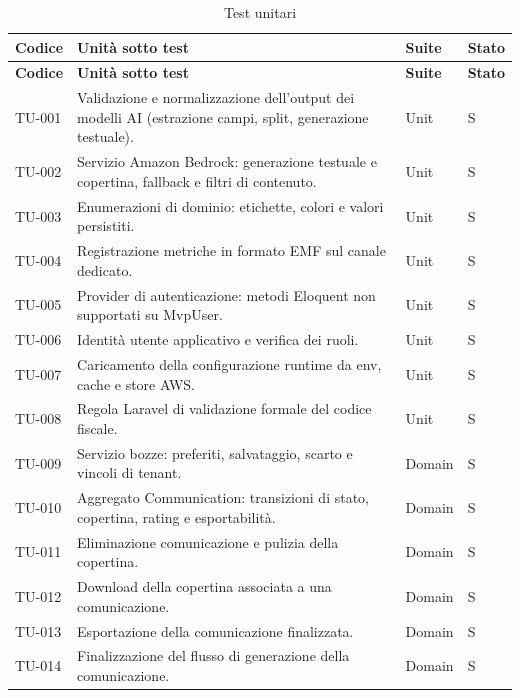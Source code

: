 \documentclass[a4paper,12pt]{article}
\begin{document}
\renewcommand{\arraystretch}{1.15}
\begin{longtable}{|p{2.0cm}|p{8.8cm}|p{2.2cm}|p{1.5cm}|}
    \caption{Test unitari} \label{tab:tu} \\
    \hline
    \rowcolor{gray!20}
    \textbf{Codice} & \textbf{Unità sotto test} & \textbf{Suite} & \textbf{Stato} \\
    \hline
\endfirsthead
    \hline
    \rowcolor{gray!20}
    \textbf{Codice} & \textbf{Unità sotto test} & \textbf{Suite} & \textbf{Stato} \\
    \hline
\endhead
    \hline
\endfoot
    \hline
\endlastfoot
    TU-001 & Validazione e normalizzazione dell'output dei modelli AI (estrazione campi, split, generazione testuale). & Unit & S \\
    \hline
    TU-002 & Servizio Amazon Bedrock: generazione testuale e copertina, fallback e filtri di contenuto. & Unit & S \\
    \hline
    TU-003 & Enumerazioni di dominio: etichette, colori e valori persistiti. & Unit & S \\
    \hline
    TU-004 & Registrazione metriche in formato EMF sul canale dedicato. & Unit & S \\
    \hline
    TU-005 & Provider di autenticazione: metodi Eloquent non supportati su MvpUser. & Unit & S \\
    \hline
    TU-006 & Identità utente applicativo e verifica dei ruoli. & Unit & S \\
    \hline
    TU-007 & Caricamento della configurazione runtime da env, cache e store AWS. & Unit & S \\
    \hline
    TU-008 & Regola Laravel di validazione formale del codice fiscale. & Unit & S \\
    \hline
    TU-009 & Servizio bozze: preferiti, salvataggio, scarto e vincoli di tenant. & Domain & S \\
    \hline
    TU-010 & Aggregato Communication: transizioni di stato, copertina, rating e esportabilità. & Domain & S \\
    \hline
    TU-011 & Eliminazione comunicazione e pulizia della copertina. & Domain & S \\
    \hline
    TU-012 & Download della copertina associata a una comunicazione. & Domain & S \\
    \hline
    TU-013 & Esportazione della comunicazione finalizzata. & Domain & S \\
    \hline
    TU-014 & Finalizzazione del flusso di generazione della comunicazione. & Domain & S \\

\end{longtable}
\end{document}
